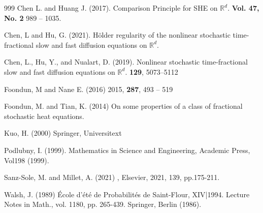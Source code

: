 \documentclass[a4paper,11pt]{article}
\numberwithin{equation}{section}
\theoremstyle{plain}
\theoremstyle{definition}
\newcommand{\R}{\mathbb{R}}
\numberwithin{NQ}{section}
\numberwithin{LQ}{section}
\numberwithin{ZQ}{section}
\begin{document}
	\begin{thebibliography}{999}
		Chen L. and Huang J. (2017).
		\newblock Comparison Principle for SHE on $\R^d$.
		 \textbf{Vol. 47, No. 2} 989 -- 1035.
		
		Chen, L and Hu, G. (2021).
		\newblock H\"older regularity of the nonlinear stochastic time-fractional slow and fast diffusion equations on $\R^d$.
		
		Chen, L., Hu, Y., and Nualart, D. (2019).
		\newblock Nonlinear stochastic time-fractional slow and fast diffusion equations on $\R^d$.
		 \textbf{129}, 5073--5112
		
		Foondun, M and Nane E. (2016)
		 2015, \textbf{287}, 493 -- 519
		
		Foondun, M. and Tian, K. (2014)
		\newblock On some properties of a class of fractional stochastic heat equations.
		
		Kuo, H. (2000)
		\newblock Springer, Universitext
		
		Podlubny, I. (1999).
		\newblock Mathematics in Science and Engineering, Academic Press, Vol198 (1999).
		
		Sanz-Sole, M. and Millet, A. (2021)
		, Elsevier, 2021, 139, pp.175-211.
		
		Walsh, J. (1989)
		\newblock \'Ecole d'\'et\'e de Probabilit\'es de Saint-Flour, XIV|1994. Lecture Notes in Math., vol. 1180, pp. 265-439. Springer, Berlin (1986).
	\end{thebibliography}
	
\end{document}
